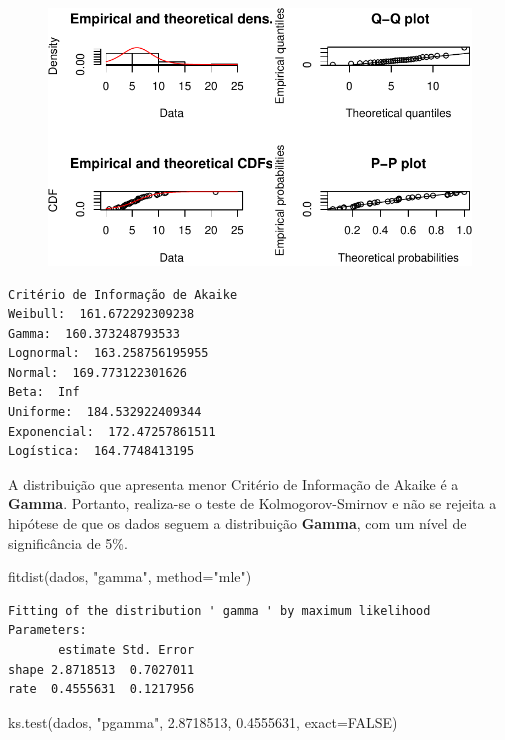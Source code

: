 \documentclass[
  letterpaper,
  DIV=11,
  numbers=noendperiod]{scrartcl}
\newenvironment{Shaded}{\begin{snugshade}}{\end{snugshade}}
\newcommand{\AttributeTok}[1]{\textcolor[rgb]{0.40,0.45,0.13}{#1}}
\newcommand{\ConstantTok}[1]{\textcolor[rgb]{0.56,0.35,0.01}{#1}}
\newcommand{\FloatTok}[1]{\textcolor[rgb]{0.68,0.00,0.00}{#1}}
\newcommand{\FunctionTok}[1]{\textcolor[rgb]{0.28,0.35,0.67}{#1}}
\newcommand{\NormalTok}[1]{\textcolor[rgb]{0.00,0.23,0.31}{#1}}
\newcommand{\StringTok}[1]{\textcolor[rgb]{0.13,0.47,0.30}{#1}}
\begin{document}
\begin{figure}[H]

{\centering \includegraphics{quiz5_files/figure-pdf/unnamed-chunk-31-9.pdf}

}

\end{figure}

\begin{verbatim}
Critério de Informação de Akaike
Weibull:  161.672292309238 
Gamma:  160.373248793533 
Lognormal:  163.258756195955 
Normal:  169.773122301626 
Beta:  Inf 
Uniforme:  184.532922409344 
Exponencial:  172.47257861511 
Logística:  164.7748413195 
\end{verbatim}

A distribuição que apresenta menor Critério de Informação de Akaike é a
\textbf{Gamma}. Portanto, realiza-se o teste de Kolmogorov-Smirnov e não
se rejeita a hipótese de que os dados seguem a distribuição
\textbf{Gamma}, com um nível de significância de 5\%.

\begin{Shaded}
\begin{Highlighting}[]
\FunctionTok{fitdist}\NormalTok{(dados, }\StringTok{"gamma"}\NormalTok{, }\AttributeTok{method=}\StringTok{"mle"}\NormalTok{)}
\end{Highlighting}
\end{Shaded}

\begin{verbatim}
Fitting of the distribution ' gamma ' by maximum likelihood 
Parameters:
       estimate Std. Error
shape 2.8718513  0.7027011
rate  0.4555631  0.1217956
\end{verbatim}

\begin{Shaded}
\begin{Highlighting}[]
\FunctionTok{ks.test}\NormalTok{(dados, }\StringTok{"pgamma"}\NormalTok{, }\FloatTok{2.8718513}\NormalTok{, }\FloatTok{0.4555631}\NormalTok{, }\AttributeTok{exact=}\ConstantTok{FALSE}\NormalTok{)}
\end{Highlighting}
\end{Shaded}
\end{document}
